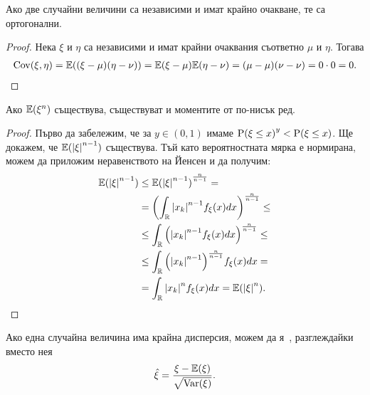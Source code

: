\documentclass[numbers=endperiod, bibliography=totocnumbered]{scrartcl}
\begin{document}
\begin{proposition}\label{thm:independence_implies_orthogonality}
  Ако две случайни величини са независими и имат крайно очакване, те са ортогонални.
\end{proposition}
\begin{proof}
  Нека \( \xi \) и \( \eta \) са независими и имат крайни очаквания съответно \( \mu \) и \( \eta \). Тогава
  \begin{align*}
    \operatorname{Cov}(\xi, \eta)
    =
    \mathbb{E}((\xi - \mu) (\eta - \nu))
    =
    \mathbb{E}(\xi - \mu) \mathbb{E}(\eta - \nu)
    =
    (\mu - \mu) (\nu - \nu)
    =
    0 \cdot 0
    =
    0.
  \end{align*}
\end{proof}

\begin{proposition}\label{thm:lower_order_moments_exist}
  Ако \( \mathbb{E}(\xi^n) \) съществува, съществуват и моментите от по-нисък ред.
\end{proposition}
\begin{proof}
  Първо да забележим, че за \( y \in (0, 1) \) имаме \( {\operatorname{P}(\xi \leq x)}^y < \operatorname{P}(\xi \leq x) \). Ще докажем, че \( \mathbb{E}({\left\vert \xi \right\vert}^{n-1}) \) съществува. Тъй като вероятностната мярка е нормирана, можем да приложим неравенството на Йенсен и да получим:
  \begin{align*}
    \mathbb{E}({\left\vert \xi \right\vert}^{n-1})
    &\leq
    {\mathbb{E}({\left\vert \xi \right\vert}^{n-1})}^{\frac n {n-1}}
    = \\ &=
    {\left( \int_{\mathbb{R}} {\left\vert x_k \right\vert}^{n-1} f_\xi(x) dx \right)}^{\frac n {n-1}}
    \leq \\ &\leq
    \int_{\mathbb{R}} {\left({\left\vert x_k \right\vert}^{n-1} f_\xi(x) dx \right)}^{\frac n {n-1}}
    \leq \\ &\leq
    \int_{\mathbb{R}} {\left({\left\vert x_k \right\vert}^{n-1} \right)}^{\frac n {n-1}} f_\xi(x) dx
    = \\ &=
    \int_{\mathbb{R}} {\left\vert x_k \right\vert}^n f_\xi(x) dx
    =
    \mathbb{E}({\left\vert \xi \right\vert}^n).
  \end{align*}
\end{proof}

\begin{definition}
  Ако една случайна величина има крайна дисперсия, можем да я~, разглеждайки вместо нея
  \begin{align*}
    \hat \xi = \frac {\xi - \mathbb{E}(\xi)} {\sqrt{\operatorname{Var}(\xi)}}.
  \end{align*}
\end{definition}
\end{document}
